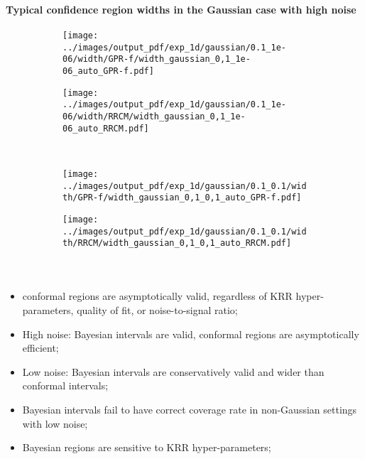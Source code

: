 \documentclass[t]{beamer}  %
\begin{document}
\begin{frame}[t]\frametitle{\insertsection}
  \framesubtitle{Typical confidence region widths in the Gaussian case with high noise}
  \begin{figure}
    \centering
    \begin{subfigure}[b]{0.45\linewidth}
      \texttt{[image: ../images/output\_pdf/exp\_1d/gaussian/0.1\_1e-06/width/GPR-f/width\_gaussian\_0,1\_1e-06\_auto\_GPR-f.pdf]}
    \end{subfigure}%
    \begin{subfigure}[b]{0.45\linewidth}
      \texttt{[image: ../images/output\_pdf/exp\_1d/gaussian/0.1\_1e-06/width/RRCM/width\_gaussian\_0,1\_1e-06\_auto\_RRCM.pdf]}
    \end{subfigure}\\
    \begin{subfigure}[b]{0.45\linewidth}
      \texttt{[image: ../images/output\_pdf/exp\_1d/gaussian/0.1\_0.1/width/GPR-f/width\_gaussian\_0,1\_0,1\_auto\_GPR-f.pdf]}
    \end{subfigure}%
    \begin{subfigure}[b]{0.45\linewidth}
      \texttt{[image: ../images/output\_pdf/exp\_1d/gaussian/0.1\_0.1/width/RRCM/width\_gaussian\_0,1\_0,1\_auto\_RRCM.pdf]}
    \end{subfigure}\\
  \end{figure}
\end{frame}

\begin{frame}[c]\frametitle{\insertsection}
  \framesubtitle{\insertsubsection}
  \begin{itemize}
    \item conformal regions are asymptotically valid, regardless of KRR hyper-parameters,
    quality of fit, or noise-to-signal ratio;
    \item High noise: Bayesian intervals are valid, conformal regions
    are asymptotically efficient;
    \vspace{\baselineskip}
    \item Low noise: Bayesian intervals are conservatively valid and
    wider than conformal intervals;
    \item Bayesian intervals fail to have correct coverage rate in non-Gaussian
    settings with low noise;
    \item Bayesian regions are sensitive to KRR hyper-parameters;
  \end{itemize}
\end{frame}
\end{document}
